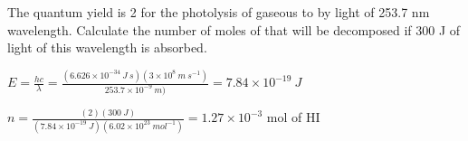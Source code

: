 \documentclass[addpoints,12pt]{exam}
\begin{document}
\begin{questions}

\question[2] 

The quantum yield is 2 for the photolysis of gaseous  to  by light of 253.7 nm wavelength. Calculate the number of moles of  that will be decomposed if 300 J of light of this wavelength is absorbed.

\begin{solution}
\(E=\frac{hc}{\lambda} = \frac{(6.626\times10^{-34}\ J\ s)(3\times10^8\ m\ s^{-1})}{253.7\times10^{-9}\ m)} = 7.84\times10^{-19}\ J\)

\(n=\frac{(2)(300\ J)}{(7.84\times10^{-19}\ J)(6.02\times10^{23}\ mol^{-1})}=1.27\times10^{-3}\) mol of HI
\end{solution}

\end{questions}
\end{document}
